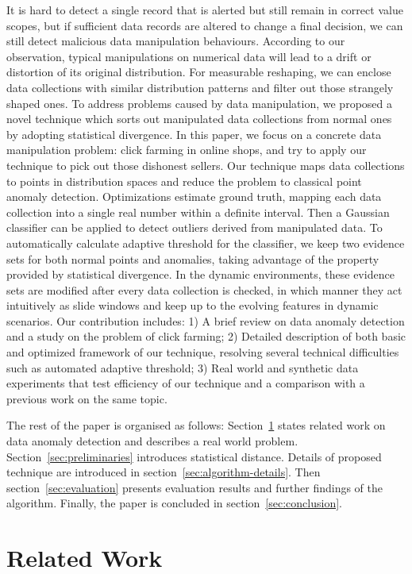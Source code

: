 \documentclass[10pt,conference,letterpaper]{article}
\begin{document}
		It is hard to detect a single record that is alerted but still remain in correct value scopes, but if sufficient data records are altered to change a final decision, we can still detect malicious data manipulation behaviours.
		According to our observation, typical manipulations on numerical data will lead to a drift or distortion of its original distribution. For measurable reshaping, we can enclose data collections with similar distribution patterns and filter out those strangely shaped ones. 
		To address problems caused by data manipulation, we proposed a novel technique which sorts out manipulated data collections from normal ones by adopting statistical divergence.
		In this paper, we focus on a concrete data manipulation problem: click farming in online shops, and try to apply our technique to pick out those dishonest sellers.
		Our technique maps data collections to points in distribution spaces and reduce the problem to classical point anomaly detection.
		Optimizations estimate ground truth, mapping each data collection into a single real number within a definite interval. Then a Gaussian classifier can be applied to detect outliers derived from manipulated data. To automatically calculate adaptive threshold for the classifier, we keep two evidence sets for both normal points and anomalies, taking advantage of the property provided by statistical divergence.
		In the dynamic environments, these evidence sets are modified after every data collection is checked, in which manner they act intuitively as slide windows and keep up to the evolving features in dynamic scenarios.
		Our contribution includes: 1) A brief review on data anomaly detection and a study on the problem of click farming; 2) Detailed description of both basic and optimized framework of our technique, resolving several technical difficulties such as automated adaptive threshold; 3) Real world and synthetic data experiments that test efficiency of our technique and a comparison with a previous work on the same topic.
		
		The rest of the paper is organised as follows: Section~\ref{sec:related-work} states related work on data anomaly detection and describes a real world problem. Section~\ref{sec:preliminaries} introduces statistical distance. Details of proposed technique are introduced in section~\ref{sec:algorithm-details}. Then section~\ref{sec:evaluation} presents evaluation results and further findings of the algorithm. Finally, the paper is concluded in section~\ref{sec:conclusion}.
		
	\section{Related Work}\label{sec:related-work}
\end{document}

